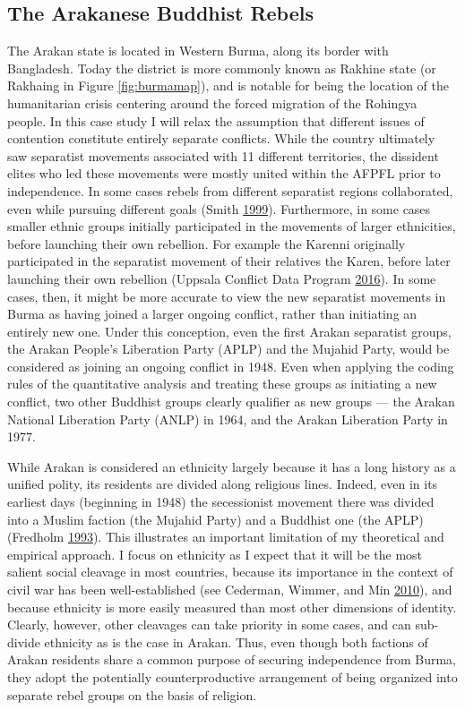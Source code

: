 \documentclass[12pt,]{book}
\theoremstyle{definition}
\theoremstyle{definition}
\theoremstyle{remark}
\begin{document}
\subsection{The Arakanese Buddhist
Rebels}\label{the-arakanese-buddhist-rebels}

The Arakan state is located in Western Burma, along its border with
Bangladesh. Today the district is more commonly known as Rakhine state
(or Rakhaing in Figure \ref{fig:burmamap}), and is notable for being the
location of the humanitarian crisis centering around the forced
migration of the Rohingya people. In this case study I will relax the
assumption that different issues of contention constitute entirely
separate conflicts. While the country ultimately saw separatist
movements associated with 11 different territories, the dissident elites
who led these movements were mostly united within the AFPFL prior to
independence. In some cases rebels from different separatist regions
collaborated, even while pursuing different goals (Smith
\protect\hyperlink{ref-Smith1999}{1999}). Furthermore, in some cases
smaller ethnic groups initially participated in the movements of larger
ethnicities, before launching their own rebellion. For example the
Karenni originally participated in the separatist movement of their
relatives the Karen, before later launching their own rebellion (Uppsala
Conflict Data Program \protect\hyperlink{ref-UCDPEncyclopedia}{2016}).
In some cases, then, it might be more accurate to view the new
separatist movements in Burma as having joined a larger ongoing
conflict, rather than initiating an entirely new one. Under this
conception, even the first Arakan separatist groups, the Arakan People's
Liberation Party (APLP) and the Mujahid Party, would be considered as
joining an ongoing conflict in 1948. Even when applying the coding rules
of the quantitative analysis and treating these groups as initiating a
new conflict, two other Buddhist groups clearly qualifier as new groups
--- the Arakan National Liberation Party (ANLP) in 1964, and the Arakan
Liberation Party in 1977.

While Arakan is considered an ethnicity largely because it has a long
history as a unified polity, its residents are divided along religious
lines. Indeed, even in its earliest days (beginning in 1948) the
secessionist movement there was divided into a Muslim faction (the
Mujahid Party) and a Buddhist one (the APLP) (Fredholm
\protect\hyperlink{ref-Fredholm1993}{1993}). This illustrates an
important limitation of my theoretical and empirical approach. I focus
on ethnicity as I expect that it will be the most salient social
cleavage in most countries, because its importance in the context of
civil war has been well-established (see Cederman, Wimmer, and Min
\protect\hyperlink{ref-Cederman2010}{2010}), and because ethnicity is
more easily measured than most other dimensions of identity. Clearly,
however, other cleavages can take priority in some cases, and can
sub-divide ethnicity as is the case in Arakan. Thus, even though both
factions of Arakan residents share a common purpose of securing
independence from Burma, they adopt the potentially counterproductive
arrangement of being organized into separate rebel groups on the basis
of religion.
\end{document}

